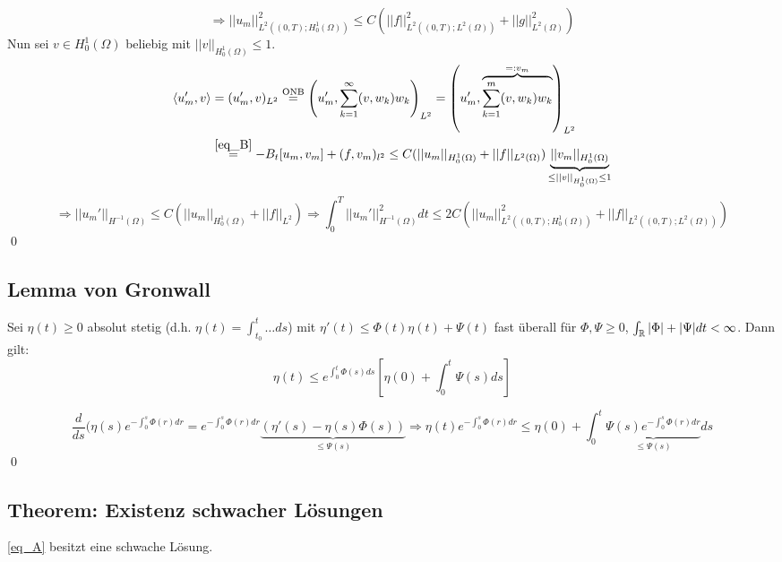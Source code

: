 	\[ \Rightarrow ||u_m||_{L^2((0,T);H_0^1(\Omega))}^2 \leq C (||f||_{L^2((0,T);L^2(\Omega))}^2 + ||g||_{L^2(\Omega)}^2) \]
	Nun sei $v \in H_0^1(\Omega)$ beliebig mit $||v||_{H_0^1(\Omega)} \leq 1$.
	\begin{equation}
	\begin{aligned}
		\langle u_m',v \rangle &= (u_m',v)_{L^2} \overset{\text{ONB}}{=} \enbrace*{u_m', \sum\limits_{k=1}^\infty (v,w_k)w_k}_{L^2} = \enbrace*{u_m', \overbrace{\sum\limits_{k=1}^{m} (v,w_k)w_k}^{=: v_m}}_{L^2} \\
		&\overset{\eqref{eq_B}}{=} -B_t [u_m,v_m] + (f,v_m)_{l^2} \leq C (||u_m||_{H_0^1(\Omega)} + ||f||_{L^2(\Omega)}) \underbrace{||v_m||_{H_0^1(\Omega)}}_{\leq ||v||_{H_0^1(\Omega)} \leq 1} \notag
	\end{aligned}
	\end{equation}
	\[ \Rightarrow ||u_m'||_{H^{-1}(\Omega)} \leq C( ||u_m||_{H_0^1(\Omega)} + ||f||_{L^2}) \Rightarrow \int_{0}^{T} ||u_m'||_{H^{-1}(\Omega)}^2 dt \leq 2C (||u_m||_{L^2((0,T);H_0^1(\Omega))}^2 + ||f||_{L^2((0,T);L^2(\Omega))}) \]
	\qed
	
\subsection{Lemma von Gronwall}
\label{gronwall}
	Sei $\eta(t) \geq 0$ absolut stetig  (d.h. $\eta(t) = \int_{t_0}^{t} \dots ds$) mit $\eta'(t) \leq \Phi(t) \eta(t) + \Psi(t)$ fast überall für $\Phi,\Psi \geq 0$, $\int_{\RR} |\Phi|+|\Psi| dt < \infty$. Dann gilt:
	\[ \eta(t) \leq e^{\int_0^t \Phi(s) ds} \left\lbrack \eta(0) + \int_{0}^{t} \Psi(s) ds\right\rbrack \]

	\[ \frac{d}{ds} (\eta(s) e^{-\int_{0}^{s} \Phi(r) dr} = e^{-\int_{0}^{s} \Phi(r) dr} \underbrace{(\eta'(s) - \eta(s) \Phi(s))}_{\leq \Psi(s)} \Rightarrow \eta(t) e^{-\int_{0}^{s} \Phi(r) dr} \leq \eta(0) + \int_{0}^{t} \underbrace{\Psi(s) e^{-\int_{0}^{s} \Phi(r)dr}}_{\leq \Psi(s)} ds \] \qed
	
\subsection{Theorem: Existenz schwacher Lösungen}
	\eqref{eq_A} besitzt eine schwache Lösung.
	

